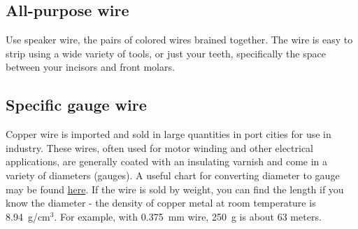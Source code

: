 \subsection{All-purpose wire}
Use speaker wire, 
the pairs of colored wires brained together. 
The wire is easy to strip using a wide variety of tools, 
or just your teeth, 
specifically the space between your incisors and front molars.

\subsection{Specific gauge wire}
Copper wire is imported and sold in large quantities in port cities 
for use in industry. 
These wires, 
often used for motor winding and other electrical applications, 
are generally coated with an insulating varnish 
and come in a variety of diameters (gauges). 
A useful chart for converting diameter to gauge may be found  
\href{http://www.dave-cushman.net/elect/wiregauge.html}{here}. 
If the wire is sold by weight, 
you can find the length if you know the diameter - 
the density of copper metal at room temperature is 8.94~g/cm$^{3}$. 
For example, 
with 0.375~mm wire, 
250~g is about 63 meters.

